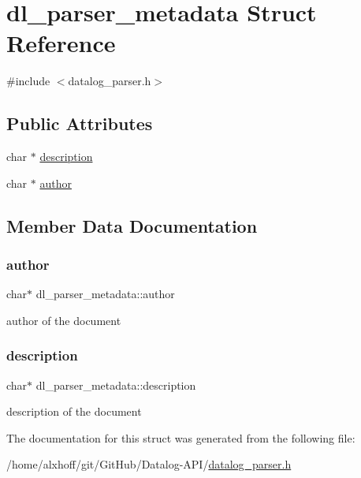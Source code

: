 \hypertarget{structdl__parser__metadata}{}\section{dl\+\_\+parser\+\_\+metadata Struct Reference}
\label{structdl__parser__metadata}


{\ttfamily \#include $<$datalog\+\_\+parser.\+h$>$}

\subsection*{Public Attributes}
\begin{DoxyCompactItemize}
\item 
char $\ast$ \hyperlink{structdl__parser__metadata_ab77a099560bf8f708cb7d0d84a90e3f0}{description}
\item 
char $\ast$ \hyperlink{structdl__parser__metadata_ae65dba395d288088c23042c14893235e}{author}
\end{DoxyCompactItemize}


\subsection{Member Data Documentation}
\mbox{\label{structdl__parser__metadata_ae65dba395d288088c23042c14893235e}} 
\subsubsection{\texorpdfstring{author}{author}}
{\footnotesize\ttfamily char$\ast$ dl\+\_\+parser\+\_\+metadata\+::author}

author of the document \mbox{\label{structdl__parser__metadata_ab77a099560bf8f708cb7d0d84a90e3f0}} 
\subsubsection{\texorpdfstring{description}{description}}
{\footnotesize\ttfamily char$\ast$ dl\+\_\+parser\+\_\+metadata\+::description}

description of the document 

The documentation for this struct was generated from the following file\+:\begin{DoxyCompactItemize}
\item 
/home/alxhoff/git/\+Git\+Hub/\+Datalog-\/\+A\+P\+I/\hyperlink{datalog__parser_8h}{datalog\+\_\+parser.\+h}\end{DoxyCompactItemize}
